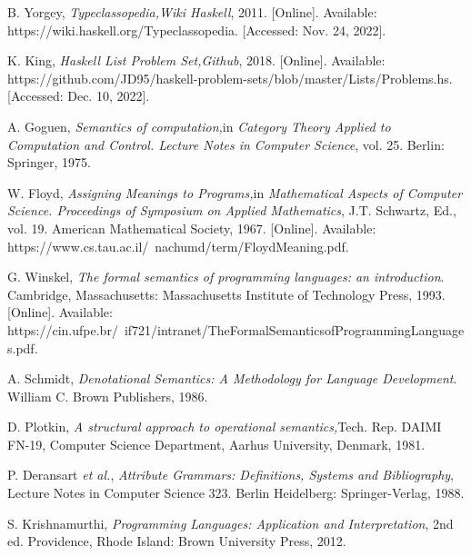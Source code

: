 \begin{thebibliography}{11}
    \label{sec:18}
    \hypertarget{18}{}
    B. Yorgey, \textit{Typeclassopedia,}\textit{Wiki Haskell}, 2011. [Online]. Available: https://wiki.haskell.org/Typeclassopedia. [Accessed: Nov. 24, 2022].

    \label{sec:19}
    \hypertarget{19}{}
    K. King, \textit{Haskell List Problem Set,}\textit{Github}, 2018. [Online]. Available: https://github.com/JD95/haskell-problem-sets/blob/master/Lists/Problems.hs. [Accessed: Dec. 10, 2022].

    \label{sec:20}
    \hypertarget{20}{}
    A. Goguen, \textit{Semantics of computation,}in \textit{Category Theory Applied to Computation and Control. Lecture Notes in Computer Science}, vol. 25. Berlin: Springer, 1975.

    \label{sec:21}
    \hypertarget{21}{}
    W. Floyd, \textit{Assigning Meanings to Programs,}in \textit{Mathematical Aspects of Computer Science. Proceedings of Symposium on Applied Mathematics}, J.T. Schwartz, Ed., vol. 19. American Mathematical Society, 1967. [Online]. Available: https://www.cs.tau.ac.il/~nachumd/term/FloydMeaning.pdf.

    \label{sec:22}
    \hypertarget{22}{}
    G. Winskel, \textit{The formal semantics of programming languages: an introduction}. Cambridge, Massachusetts: Massachusetts Institute of Technology Press, 1993. [Online]. Available: https://cin.ufpe.br/~if721/intranet/TheFormalSemanticsofProgrammingLanguages.pdf.


    \label{sec:23}
    \hypertarget{23}{}
    A. Schmidt, \textit{Denotational Semantics: A Methodology for Language Development}. William C. Brown Publishers, 1986.

    \label{sec:24}
    \hypertarget{24}{}
    D. Plotkin, \textit{A structural approach to operational semantics,}Tech. Rep. DAIMI FN-19, Computer Science Department, Aarhus University, Denmark, 1981.
    
    \label{sec:25}
    \hypertarget{25}{}
    P. Deransart \textit{et al.}, \textit{Attribute Grammars: Definitions, Systems and Bibliography}, Lecture Notes in Computer Science 323. Berlin Heidelberg: Springer-Verlag, 1988.

    \label{sec:26}
    \hypertarget{26}{}
    S. Krishnamurthi, \textit{Programming Languages: Application and Interpretation}, 2nd ed. Providence, Rhode Island: Brown University Press, 2012.


\end{thebibliography}
